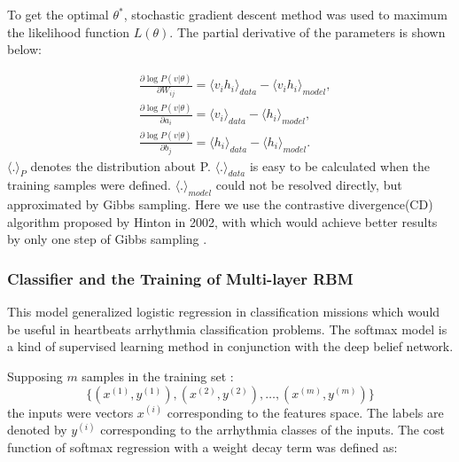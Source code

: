 \documentclass{bmcart}
\begin{document}
To get the optimal $\theta^*$, stochastic gradient descent\cite{Leon} method was used to maximum the likelihood function $L(\theta)$. The partial derivative of the parameters is shown below:

\begin{equation}
\begin{split}
&\frac{\partial\log P(v|\theta)}{\partial W_{ij}} = \langle v_i h_i \rangle_{data} -\langle v_i h_i \rangle_{model},\\
&\frac{\partial\log P(v|\theta)}{\partial a_{i}} = \langle v_i \rangle_{data} -\langle h_i \rangle_{model},\\
&\frac{\partial\log P(v|\theta)}{\partial b_{j}} = \langle h_i \rangle_{data} -\langle h_i \rangle_{model}.
\end{split}
\end{equation}
$\langle . \rangle_P$ denotes the distribution about P. $\langle . \rangle_{data}$ is easy to be calculated when the training samples were defined. $\langle . \rangle_{model}$ could not be resolved directly, but approximated by Gibbs sampling. Here we use the contrastive divergence(CD)\cite{Hinton02} algorithm proposed by Hinton in 2002, with which would achieve better results by only one step of Gibbs sampling .

\subsubsection*{Classifier and the Training of Multi-layer RBM}
This model generalized logistic regression \cite{Peng} in classification missions which would be useful in heartbeats arrhythmia classification problems. The softmax model is a kind of supervised learning method in conjunction with the deep belief network.

Supposing $m$ samples in the training set :
\begin{equation}
\{(x^{(1)},y^{(1)}), (x^{(2)},y^{(2)}), \ldots, (x^{(m)},y^{(m)}) \}
\end{equation}
the inputs were vectors $x^{(i)}$ corresponding to the features space. The labels are denoted by $y^{(i)}$  corresponding to the arrhythmia classes of the inputs.
The cost function of softmax regression with a weight decay term was defined as:
\end{document}

